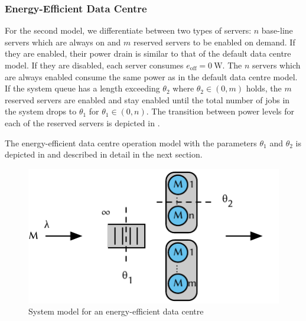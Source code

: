 \subsubsection*{Energy-Efficient Data Centre}\label{sec:cloud:data_centers:problem_formulation:energy_efficient_data_center}
For the second model, we differentiate between two types of servers:
\(n\) base-line servers which are always on and \(m\) reserved servers to be enabled on demand.
If they are enabled, their power drain is similar to that of the default data centre model.
If they are disabled, each server consumes \(e_\text{off} = \SI{0}{\watt}\).
The \(n\) servers which are always enabled consume the same power as in the default data centre model.
If the system queue has a length exceeding \(\theta_2\) where \(\theta_2 \in (0, m)\) holds, the \(m\) reserved servers are enabled and stay enabled until the total number of jobs in the system drops to \(\theta_1\) for \(\theta_1 \in (0, n)\).
The transition between power levels for each of the reserved servers is depicted in .

The energy-efficient data centre operation model with the parameters \(\theta_1\) and \(\theta_2\) is depicted in  and described in detail in the next section.

\begin{figure}
  \centering
  \includegraphics{cloud/data_centers/problem_formulation/figures/model}
  \caption{System model for an energy-efficient data centre}
  \label{fig:cloud:data_centers:problem_formulation:model}
\end{figure}
